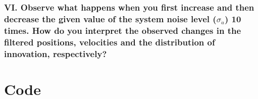 \documentclass{article}
\begin{document}
\subsubsection*{VI. Observe what happens when you first increase and then decrease the given value of
the system noise level ($\sigma_{\dot a}$) 10 times. How do you interpret the observed changes
in the filtered positions, velocities and the distribution of innovation, respectively?}

\newpage
\section*{Code}

\end{document}
